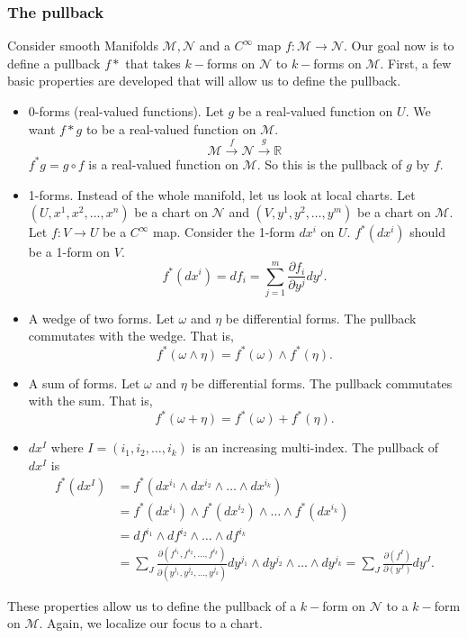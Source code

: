 \documentclass{article}
\begin{document}
\subsubsection{The pullback}
Consider smooth Manifolds $\mathcal{M},\mathcal{N}$ and a $C^\infty$ map $f:\mathcal{M} \to \mathcal{N}$. Our goal now is to define a pullback $f*$ that takes $k-$forms on $\mathcal{N}$ to $k-$forms on $\mathcal{M}$. First, a few basic properties are developed that will allow us to define the pullback.
\begin{itemize}
    \item 0-forms (real-valued functions). Let $g$ be a real-valued function on $U$. We want $f*g$ to be a real-valued function on $\mathcal{M}$. 
    \[
        \mathcal{M} \xrightarrow{f} \mathcal{N} \xrightarrow{g} \mathbb{R}
    \]
    $f^*g = g \circ f$ is a real-valued function on $\mathcal{M}$. So this is the pullback of $g$ by $f$.
    \item 1-forms. Instead of the whole manifold, let us look at local charts. Let $(U, x^1, x^2, \ldots, x^n)$ be a chart on $\mathcal{N}$ and $(V, y^1, y^2, \ldots, y^m)$ be a chart on $\mathcal{M}$. Let $f: V \to U$ be a $C^\infty$ map. Consider the 1-form $dx^i$ on $U$. $f^*(dx^i)$ should be a 1-form on $V$. 
    \[
        f^*(dx^i) = df_i = \sum_{j=1}^m \frac{\partial f_i}{\partial y^j} dy^j.
    \]
    \item A wedge of two forms. Let $\omega$ and $\eta$ be differential forms. The pullback commutates with the wedge. That is,
    \[
        f^*(\omega \wedge \eta) = f^*(\omega) \wedge f^*(\eta).
    \]
    \item A sum of forms. Let $\omega$ and $\eta$ be differential forms. The pullback commutates with the sum. That is,
    \[
        f^*(\omega + \eta) = f^*(\omega) + f^*(\eta).
    \]
    \item $dx^I$ where $I = (i_1, i_2, \ldots, i_k)$ is an increasing multi-index. The pullback of $dx^I$ is
    \begin{align*}
        f^*(dx^I) &= f^*(dx^{i_1} \wedge dx^{i_2} \wedge \ldots \wedge dx^{i_k})\\
        &= f^*(dx^{i_1}) \wedge f^*(dx^{i_2}) \wedge \ldots \wedge f^*(dx^{i_k})\\
        &= df^{i_1} \wedge df^{i_2} \wedge \ldots \wedge df^{i_k}\\
        &= \sum_{J} \frac{
            \partial(f^{i_1}, f^{i_2}, \ldots, f^{i_k})
        }{
            \partial(y^{j_1}, y^{j_2}, \ldots, y^{j_k})
        } dy^{j_1} \wedge dy^{j_2} \wedge \ldots \wedge dy^{j_k}
        = \sum_{J} \frac{
            \partial(f^{I})
        }{
            \partial(y^{J})
        } dy^{J}.
    \end{align*}
\end{itemize}
These properties allow us to define the pullback of a $k-$form on $\mathcal{N}$ to a $k-$form on $\mathcal{M}$. Again, we localize our focus to a chart. 
\end{document}
